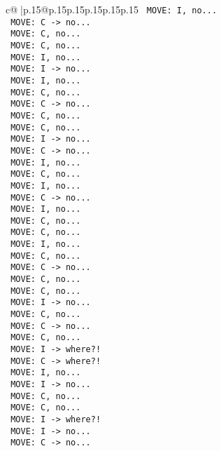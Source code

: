 \documentclass{article}
\begin{document}
{\begin{supertabular}{c@{$\;$}|p{.15\linewidth}@{}p{.15\linewidth}p{.15\linewidth}p{.15\linewidth}p{.15\linewidth}p{.15\linewidth}}
{{{\texttt{ MOVE: I, no...} \\
\texttt{ MOVE: C {-}> no...} \\
\texttt{ MOVE: C, no...} \\
\texttt{ MOVE: C, no...} \\
\texttt{ MOVE: I, no...} \\
\texttt{ MOVE: I {-}> no...} \\
\texttt{ MOVE: I, no...} \\
\texttt{ MOVE: C, no...} \\
\texttt{ MOVE: C {-}> no...} \\
\texttt{ MOVE: C, no...} \\
\texttt{ MOVE: C, no...} \\
\texttt{ MOVE: I {-}> no...} \\
\texttt{ MOVE: C {-}> no...} \\
\texttt{ MOVE: I, no...} \\
\texttt{ MOVE: C, no...} \\
\texttt{ MOVE: I, no...} \\
\texttt{ MOVE: C {-}> no...} \\
\texttt{ MOVE: I, no...} \\
\texttt{ MOVE: C, no...} \\
\texttt{ MOVE: C, no...} \\
\texttt{ MOVE: I, no...} \\
\texttt{ MOVE: C, no...} \\
\texttt{ MOVE: C {-}> no...} \\
\texttt{ MOVE: C, no...} \\
\texttt{ MOVE: C, no...} \\
\texttt{ MOVE: I {-}> no...} \\
\texttt{ MOVE: C, no...} \\
\texttt{ MOVE: C {-}> no...} \\
\texttt{ MOVE: C, no...} \\
\texttt{ MOVE: I {-}> where?!} \\
\texttt{ MOVE: C {-}> where?!} \\
\texttt{ MOVE: I, no...} \\
\texttt{ MOVE: I {-}> no...} \\
\texttt{ MOVE: C, no...} \\
\texttt{ MOVE: C, no...} \\
\texttt{ MOVE: I {-}> where?!} \\
\texttt{ MOVE: I {-}> no...} \\
\texttt{ MOVE: C {-}> no...} \\
}}}
\end{supertabular}}
\end{document}

